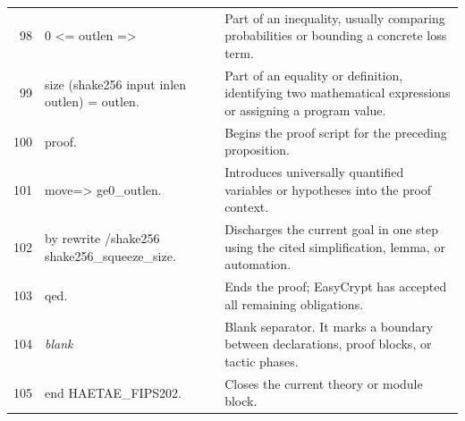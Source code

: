 \documentclass[10pt]{article}
\begin{document}
\begin{longtable}{r L{0.53\textwidth} L{0.37\textwidth}}
98 & {\ttfamily\scriptsize   0 <= outlen =>} & Part of an inequality, usually comparing probabilities or bounding a concrete loss term. \\
99 & {\ttfamily\scriptsize   size (shake256 input inlen outlen) = outlen.} & Part of an equality or definition, identifying two mathematical expressions or assigning a program value. \\
100 & {\ttfamily\scriptsize proof.} & Begins the proof script for the preceding proposition. \\
101 & {\ttfamily\scriptsize move=> ge0\_outlen.} & Introduces universally quantified variables or hypotheses into the proof context. \\
102 & {\ttfamily\scriptsize by rewrite /shake256 shake256\_squeeze\_size.} & Discharges the current goal in one step using the cited simplification, lemma, or automation. \\
103 & {\ttfamily\scriptsize qed.} & Ends the proof; EasyCrypt has accepted all remaining obligations. \\
104 & {\ttfamily\scriptsize \emph{blank}} & Blank separator.  It marks a boundary between declarations, proof blocks, or tactic phases. \\
105 & {\ttfamily\scriptsize end HAETAE\_FIPS202.} & Closes the current theory or module block. \\
\bottomrule
\end{longtable}
\end{document}

